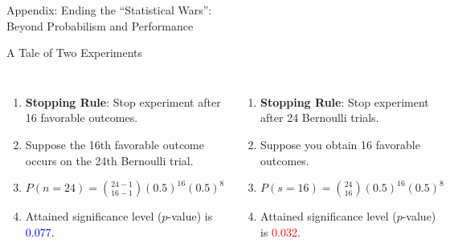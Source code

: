 \documentclass{beamer}
\begin{document}
\begin{frame}{Appendix: Ending the ``Statistical Wars'':\\Beyond Probabilism and Performance}
\begin{center} A Tale of Two Experiments \end{center}

\begin{columns}[t, onlytextwidth]     
                \begin{enumerate}
                   \item \textbf{Stopping Rule}: Stop experiment after 16 favorable outcomes.
                   \item Suppose the 16th favorable outcome occurs on the 24th Bernoulli trial.
                   \item $P(n = 24) = \binom{24 - 1}{16 - 1}(0.5)^{16}(0.5)^{8}$
                   \item Attained significance level ($p$-value) is \textcolor{blue}{0.077}.                
                   \end{enumerate}
            
            
                \begin{enumerate}
                    \item \textbf{Stopping Rule}: Stop experiment after 24 Bernoulli trials.
                    \item Suppose you obtain 16 favorable outcomes.
                    \item $P(s = 16) = \binom{24}{16}(0.5)^{16}(0.5)^{8}$
                    \item Attained significance level ($p$-value) is \textcolor{red}{0.032}.
                \end{enumerate}
        \end{columns}      
\end{frame} 
\end{document}
